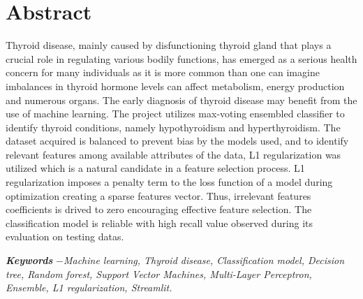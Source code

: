 \chapter*{Abstract}
Thyroid disease, mainly caused by disfunctioning thyroid gland that plays a crucial role in regulating various bodily functions, has emerged as a serious health concern for many individuals as it is more common than one can imagine imbalances in thyroid hormone levels can affect metabolism, energy production and numerous organs. 
The early diagnosis of thyroid disease may benefit from the use of machine learning. The project utilizes max-voting ensembled classifier to identify thyroid conditions, namely hypothyroidism and hyperthyroidism. The dataset acquired is balanced to prevent bias by the models used, and to identify relevant features among available attributes of the data, L1 regularization was utilized which is a natural candidate in a feature selection process. L1 regularization imposes a penalty term to the loss function of a model during optimization creating a sparse features vector. Thus, irrelevant features coefficients is drived to zero encouraging effective feature selection. The classification model is reliable with high recall value observed during its evaluation on testing datas.


\par
\textbf{\textit{Keywords}} \textit{$-$Machine learning, Thyroid disease, Classification model, Decision tree, Random forest, Support Vector Machines, Multi-Layer Perceptron, Ensemble, L1 regularization, Streamlit.}

















{

\KECadjusttocspacings %
\makeatletter
\def\@makeschapterhead#1{%
  {\newpage \parindent \z@ \raggedright
    \normalfont
    \interlinepenalty\@M
    \center \fontsize{16pt}{1} \bfseries \MakeUppercase{#1}\par\nobreak
    \vskip 18\p@ %
  }}
\makeatother 



\tableofcontents %
\listoffigures %
\listoftables %
}

